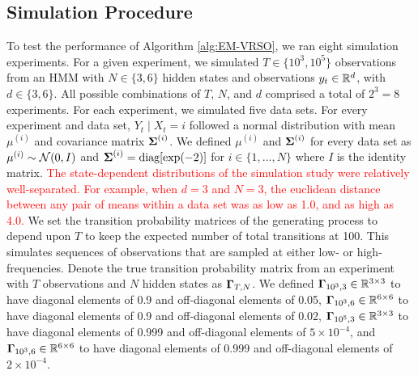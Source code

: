 
\subsection{Simulation Procedure}

To test the performance of Algorithm \ref{alg:EM-VRSO}, we ran eight simulation experiments. For a given experiment, we simulated $T \in \{10^3,10^5\}$ observations from an HMM with $N \in \{3,6\}$ hidden states and observations $y_t \in \mathbb{R}^d$, with $d \in \{3,6\}$. All possible combinations of $T$, $N$, and $d$ comprised a total of $2^3 = 8$ experiments. For each experiment, we simulated five data sets. For every experiment and data set, $Y_t \mid X_t = i$ followed a normal distribution with mean $\mu^{(i)}$ and covariance matrix $\boldsymbol{\Sigma}^{(i)}$. We defined $\mu^{(i)}$ and $\boldsymbol{\Sigma}^{(i)}$ for every data set as
%
$\mu^{(i)} \sim \mathcal{N}(0,I)$ and $\boldsymbol{\Sigma}^{(i)} = \text{diag}[\exp(-2)]$ for $i \in \{1,\ldots,N\}$
%
where $I$ is the identity matrix. \textcolor{red}{The state-dependent distributions of the simulation study were relatively well-separated. For example, when $d = 3$ and $N = 3$, the euclidean distance between any pair of means within a data set was as low as 1.0, and as high as 4.0.}
%
We set the transition probability matrices of the generating process to depend upon $T$ to keep the expected number of total transitions at 100. This simulates sequences of observations that are sampled at either low- or high- frequencies.
%
Denote the true transition probability matrix from an experiment with $T$ observations and $N$ hidden states as $\boldsymbol{\Gamma}_{T,N}$. We defined $\boldsymbol{\Gamma}_{10^3,3} \in \mathbb{R}^{3 \times 3}$ to have diagonal elements of 0.9 and off-diagonal elements of 0.05, $\boldsymbol{\Gamma}_{10^3,6} \in \mathbb{R}^{6 \times 6}$ to have diagonal elements of 0.9 and off-diagonal elements of 0.02, $\boldsymbol{\Gamma}_{10^5,3} \in \mathbb{R}^{3 \times 3}$ to have diagonal elements of 0.999 and off-diagonal elements of $5 \times 10^{-4}$, and $\boldsymbol{\Gamma}_{10^3,6} \in \mathbb{R}^{6 \times 6}$ to have diagonal elements of 0.999 and off-diagonal elements of $2 \times 10^{-4}$. 
%
\iffalse

